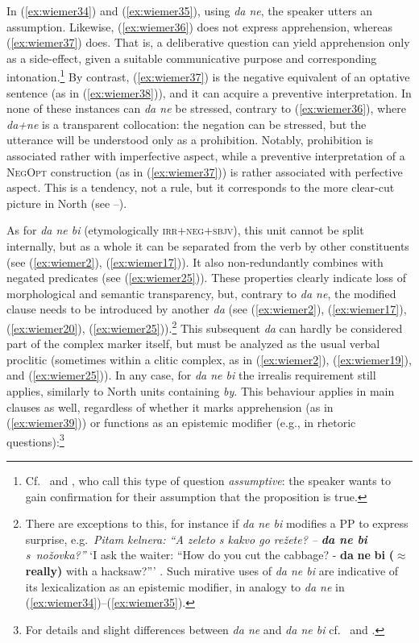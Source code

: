 \documentclass[output=paper,colorlinks,citecolor=brown]{langscibook}
\begin{document}
\noindent In (\ref{ex:wiemer34}) and (\ref{ex:wiemer35}), using \textit{da ne}, the speaker utters an assumption. Likewise, (\ref{ex:wiemer36}) does not express apprehension, whereas (\ref{ex:wiemer37}) does. That is, a deliberative question can yield apprehension only as a side-effect, given a suitable communicative purpose and corresponding intonation.\footnote{Cf.\ \citet{Bužarovska2017} and \citet[68--69]{MitkovskaEtAl2017}, who call this type of question \textit{assumptive}: the speaker wants to gain confirmation for their assumption that the proposition is true.} By contrast, (\ref{ex:wiemer37}) is the negative equivalent of an optative sentence (as in (\ref{ex:wiemer38})), and it can acquire a preventive interpretation. In none of these instances can \textit{da ne} be stressed, contrary to (\ref{ex:wiemer36}), where \textit{da+ne} is a transparent collocation: the negation can be stressed, but the utterance will be understood only as a prohibition. Notably, prohibition is associated rather with imperfective aspect, while a preventive interpretation of a \textsc{NegOpt} construction (as in (\ref{ex:wiemer37})) is rather associated with perfective aspect. This is a tendency, not a rule, but it corresponds to the more clear-cut picture in North  (see --).


As for  \textit{da ne bi} (etymologically \textsc{irr+neg+sbjv}), this unit cannot be split internally, but as a whole it can be separated from the verb by other constituents (see (\ref{ex:wiemer2}), (\ref{ex:wiemer17})). It also non-redundantly combines with negated predicates (see (\ref{ex:wiemer25})). These properties clearly indicate loss of morphological and semantic transparency, but, contrary to  \textit{da ne}, the modified clause needs to be introduced by another \textit{da} (see (\ref{ex:wiemer2}), (\ref{ex:wiemer17}), (\ref{ex:wiemer20}), (\ref{ex:wiemer25})).\footnote{There are exceptions to this, for instance if \textit{da ne bi} modifies a PP to express surprise, e.g.\ \textit{Pitam kelnera: ``A zeleto s kakvo go režete? –} \textit{\textbf{da ne bi} s~nožovka?''} `I ask the waiter: ``How do you cut the cabbage? - \textbf{da} \textbf{ne} \textbf{bi} \textbf{(${\approx}$ really)} with a hacksaw?''' \citep[148]{Ivanova2014}. Such mirative uses of \textit{da ne bi} are indicative of its lexicalization as an epistemic modifier, in analogy to  \textit{da ne} in (\ref{ex:wiemer34})--(\ref{ex:wiemer35}).} This subsequent \textit{da} can hardly be considered part of the complex marker itself, but must be analyzed as the usual verbal proclitic (sometimes within a clitic complex, as in (\ref{ex:wiemer2}), (\ref{ex:wiemer19}), and (\ref{ex:wiemer25})). In any case, for \textit{da ne bi} the irrealis requirement still applies, similarly to North  units containing \textit{by}. This behaviour applies in main clauses as well, regardless of whether it marks apprehension (as in (\ref{ex:wiemer39})) or functions as an epistemic modifier (e.g., in rhetoric questions):\footnote{For details and slight differences between  \textit{da ne} and  \textit{da ne bi} cf.\ \citet[147--150]{Ivanova2014} and \citet[70]{MitkovskaEtAl2017}.}
\end{document}

